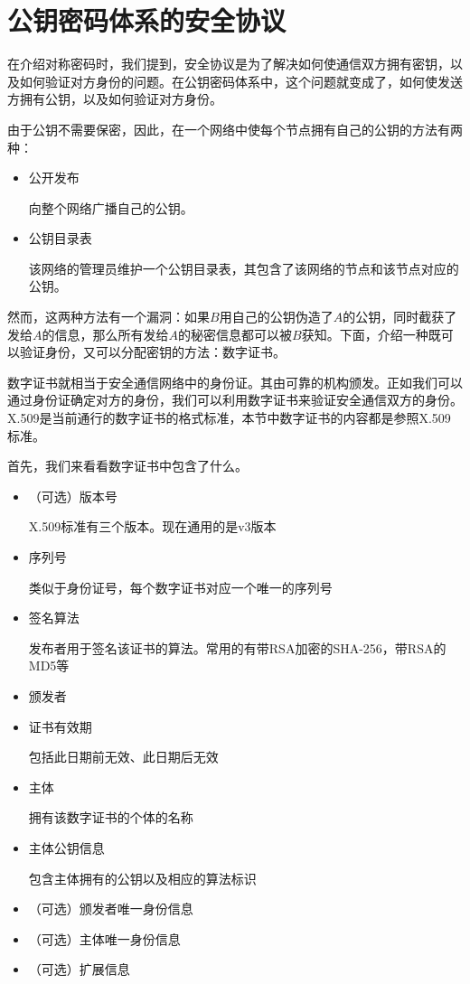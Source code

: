 \section{公钥密码体系的安全协议}
在介绍对称密码时，我们提到，安全协议是为了解决如何使通信双方拥有密钥，以及如何验证对方身份的问题。在公钥密码体系中，这个问题就变成了，如何使发送方拥有公钥，以及如何验证对方身份。\par
由于公钥不需要保密，因此，在一个网络中使每个节点拥有自己的公钥的方法有两种：
\begin{itemize}
    \item 公开发布\par
    向整个网络广播自己的公钥。
    \item 公钥目录表\par
    该网络的管理员维护一个公钥目录表，其包含了该网络的节点和该节点对应的公钥。
\end{itemize}

然而，这两种方法有一个漏洞：如果$B$用自己的公钥伪造了$A$的公钥，同时截获了发给$A$的信息，那么所有发给$A$的秘密信息都可以被$B$获知。下面，介绍一种既可以验证身份，又可以分配密钥的方法：数字证书。\par
数字证书就相当于安全通信网络中的身份证。其由可靠的机构颁发。正如我们可以通过身份证确定对方的身份，我们可以利用数字证书来验证安全通信双方的身份。X.509是当前通行的数字证书的格式标准，本节中数字证书的内容都是参照X.509标准。\par
首先，我们来看看数字证书中包含了什么。
\begin{itemize}
	\item （可选）版本号\par
	X.509标准有三个版本。现在通用的是v3版本
	\item 序列号\par
	类似于身份证号，每个数字证书对应一个唯一的序列号
	\item 签名算法\par
	发布者用于签名该证书的算法。常用的有带RSA加密的SHA-256，带RSA的MD5等
	\item 颁发者
	\item 证书有效期\par
	包括此日期前无效、此日期后无效
	\item 主体\par
	拥有该数字证书的个体的名称
	\item 主体公钥信息\par
	包含主体拥有的公钥以及相应的算法标识
	\item （可选）颁发者唯一身份信息
	\item （可选）主体唯一身份信息
	\item （可选）扩展信息
\end{itemize}

